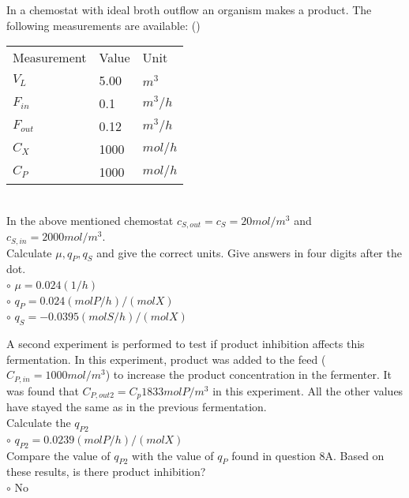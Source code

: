 \documentclass[]{beamer}
\begin{document}
\begin{frame}[shrink] {}
\addtocounter{questions}{1}
\color{blue}
In a chemostat with ideal broth outflow an organism makes a product. The following measurements are available: ()\\
\color{gray}
 \begin{tabular}[ ]{l l l}
Measurement & Value & Unit \\
$V_L$ & 5.00 & $m^3$ \\
$F_{in}$ & 0.1 & $m^{3}/h$ \\
$F_{out}$ & 0.12 & $m^{3}/h$ \\
$C_{X}$ & 1000 & $mol/h$ \\
$C_{P}$ & 1000 & $mol/h$ \\
 \end{tabular} \\
\color{black}
In the above mentioned chemostat $c_{S,out} = c_{S} =20mol/m^3$ and $c_{S,in} = 2000 mol/m^3$. \\[0.3em]
Calculate $\mu, q_P, q_S$ and give the correct units. Give answers in four digits after the dot. \\
\setlength{\parindent}{-0.4cm}
{\color{red}$\circ$} $\mu=0.024(1/h)$ \\ 
{\color{red}$\circ$} $q_P=0.024(molP/h)/(molX) $ \\ 
{\color{red}$\circ$} $q_S=-0.0395 (molS/h)/(molX)$ \\
\end{frame}

\begin{frame}[shrink] {}
  A second experiment is performed to test if product inhibition affects this fermentation. In this experiment, product was added to the feed ($C_{P,in} = 1000 mol/m^3$) to increase the product concentration in the fermenter. It was found that $C_{P,out2} =C_p  1833 mol P/m^3$ in this experiment. All the other values have stayed the same as in the previous fermentation. \\[0.3em]
Calculate the $q_{P2}$ \\ 
{\color{red}$\circ$} $q_{P2}=0.0239(molP/h)/(molX)$ \\[0.5em] 
Compare the value of $q_{P2}$ with the value of $q_{P}$ found in question 8A. Based on these results, is there product inhibition? \\
{\color{red}$\circ$} No \\ 
\end{frame}

\end{document}
